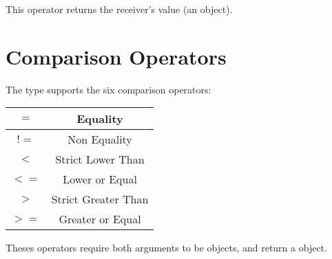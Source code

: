 This operator returns the receiver's value (an  object).






\section{Comparison Operators}

The  type supports the six comparison operators:\newline

\begin{tabular}{|c|c|}
\hline
$=$ & Equality \\
\hline
$!=$ & Non Equality \\
\hline
$<$  & Strict Lower Than \\
\hline
$<=$  & Lower or Equal \\
\hline
$>$  & Strict Greater Than \\
\hline
$>=$  & Greater or Equal \\
\hline
\end{tabular}

Theses operators require both arguments to be  objects, and return a  object.


